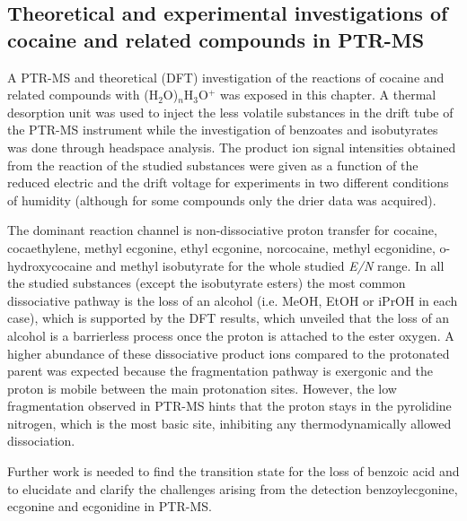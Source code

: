 \subsection{Theoretical and experimental investigations of cocaine and related compounds
in PTR-MS}

A PTR-MS and theoretical (DFT) investigation of the reactions of cocaine and related compounds with (H$_2$O)$_n$H$_3$O$^+$ was exposed in this chapter.
%
A thermal desorption unit was used to inject the less volatile substances in the drift tube of the PTR-MS instrument while the investigation of benzoates and isobutyrates was done through headspace analysis.
%
The product ion signal intensities obtained from the reaction of the studied substances were given as a function of the reduced electric and the drift voltage for experiments in two different conditions of humidity (although for some compounds only the drier data was acquired).

The dominant reaction channel is non-dissociative proton transfer for cocaine, cocaethylene, methyl ecgonine, ethyl ecgonine, norcocaine, methyl ecgonidine, o-hydroxycocaine and methyl isobutyrate for the whole studied \textit{E/N} range.
%
In all the studied substances  (except the isobutyrate esters) the most common dissociative pathway is the loss of an alcohol (i.e. MeOH, EtOH or iPrOH in each case), which is supported by the DFT results, which unveiled that the loss of an alcohol is a barrierless process once the proton is attached to the 
ester oxygen.
%
A higher abundance of these dissociative product ions compared to the protonated parent was expected because the fragmentation pathway is exergonic and the proton is mobile between the main protonation sites.
%
However, the low fragmentation observed in PTR-MS  hints that the proton stays in the pyrolidine nitrogen, which is the most basic site, inhibiting any thermodynamically allowed dissociation.

%



Further work is needed to find the transition state for the loss of benzoic acid and to elucidate and clarify the challenges arising from the detection benzoylecgonine, ecgonine and ecgonidine in PTR-MS.



